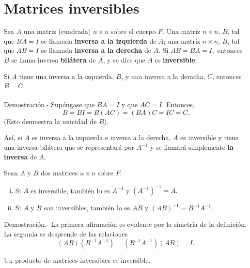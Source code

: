 \section{Matrices inversibles}

\begin{def.}
    Sea $A$ una matriz (cuadrada) $n\times n$ sobre el cuerpo $F$. Una matriz $n\times n$, $B$, tal que $BA=I$ se llamada \textbf{inversa a la izquierda} de $A$; una matriz $n\times n$, $B$, tal que $AB=I$ se llamada \textbf{inversa a la derecha} de $A$. Si $AB=BA=I,$ entonces $B$ se llama inversa \textbf{bilátera} de $A$, y se dice que $A$ es \textbf{inversible}.
\end{def.}

\begin{lema}
    Si $A$ tiene una inversa a la izquierda, $B$, y una inversa a la deracha, $C$, entonces $B=C$.\\\\
	Demostración.-\; Supóngase que $BA=I$ y que $AC=I$. Entonces,
	$$B=BI=B(AC)=(BA)C=IC=C.$$
	(Esto demuestra la unicidad de $B$).
\end{lema}

Así, si $A$ es inversa a la izquierda e inversa a la derecha, $A$ es inversible y tiene una inversa bílátera que se representará por $A^{-1}$ y se llamará simplemente \textbf{la inversa} de $A$.

\begin{teo}
    Sean $A$ y $B$ dos matrices $n\times n$ sobre $F$.

    \begin{enumerate}[(i)]
	\item Si $A$ es inversible, también lo es $A^{-1}$ y $\left(A^{-1}\right)^{-1}=A.$
	\item Si $A$ y $B$ son inversibles, también lo es $AB$ y $(AB)^{-1}=B^{-1}A^{-1}.$\\
    \end{enumerate}
	Demostración.-\; La primera afirmación es evidente por la simetría de la definición. La segunda se desprende de las relaciones 
	$$(AB)\left(B^{-1}A^{-1}\right)=\left(B^{-1}A^{-1}\right)(AB)=I.$$
\end{teo}

\begin{cor}
    Un producto de matrices inversibles es inversible.
\end{cor}

